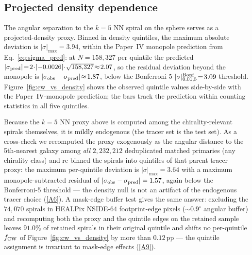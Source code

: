 \documentclass[aps,prd,twocolumn,superscriptaddress,showpacs,preprintnumbers,nofootinbib,longbibliography,floatfix]{revtex4-2}
\newcommand{\repoBase}{https://github.com/Hubify-Projects/bigbounce/blob/main}
\begin{document}
\subsection{Projected density dependence}\label{sec:results_density}

The angular separation to the $k\!=\!5$ NN spiral on the sphere serves
as a projected-density proxy. Binned in density quintiles, the maximum
absolute deviation is $|\sigma|_{\max}\!=\!3.94$,
within the Paper~IV monopole prediction from Eq.~\eqref{eq:sigma_pred}:
at $N\!=\!158{,}327$ per quintile the predicted
$|\sigma_{\rm pred}|\!=\!2\!\cdot\!|{-0.0026}|\!\cdot\!\sqrt{158{,}327}\!\approx\!2.07$,
so the residual deviation beyond the monopole is
$|\sigma_{\rm obs}-\sigma_{\rm pred}|\!\approx\!1.87$, below the
Bonferroni-5 $|\sigma|^{\rm Bonf}_{0.01,5}\!=\!3.09$ threshold.
Figure~\ref{fig:cw_vs_density} shows the observed quintile values
side-by-side with the Paper~IV-monopole prediction; the bars track the
prediction within counting statistics in all five quintiles.

Because the $k\!=\!5$ NN proxy above is computed among the
chirality-relevant spirals themselves, it is mildly endogenous (the
tracer set is the test set). As a cross-check we recomputed the proxy
exogenously as the angular distance to the 5th-nearest galaxy among
\emph{all} $2{,}232{,}212$ deduplicated matched primaries (any
chirality class) and re-binned the spirals into quintiles of that
parent-tracer proxy: the maximum per-quintile deviation is
$|\sigma|_{\max} = 3.64$ with a maximum monopole-subtracted residual
of $|\sigma_{\rm obs}-\sigma_{\rm pred}| = 1.57$, again below the
Bonferroni-5 threshold — the density null is not an artifact of the
endogenous tracer choice
(\href{\repoBase/pipelines/p5\_desi\_chirality/outputs/18\_v0151\_stratified\_and\_density.json}{[A6]}).
A mask-edge buffer test gives the same answer: excluding the
$74{,}070$ spirals in HEALPix NSIDE-$64$ footprint-edge pixels
(${\sim}0.9^\circ$ angular buffer) and recomputing both the proxy and
the quintile edges on the retained sample leaves $91.0\%$ of retained
spirals in their original quintile and shifts no per-quintile
$f_{\rm CW}$ of Figure~\ref{fig:cw_vs_density} by more than
$0.12$\,pp — the quintile assignment is invariant to mask-edge
effects
(\href{\repoBase/pipelines/p5\_desi\_chirality/outputs/22\_r24conf\_local\_batch.json}{[A9]}).
\end{document}
